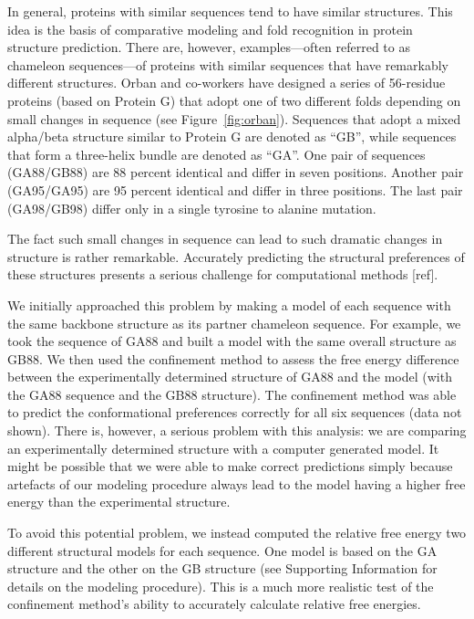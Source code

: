 \documentclass[12pt]{article}
\begin{document}
In general, proteins with similar sequences tend to have similar structures. This idea is the basis
of comparative modeling and fold recognition in protein structure prediction. There are, however,
examples---often referred to as chameleon sequences---of proteins with similar sequences that have
remarkably different structures. Orban and co-workers have designed a series of 56-residue proteins
(based on Protein G) that adopt one of two different folds depending on small changes in sequence
(see Figure~\ref{fig:orban}). Sequences that adopt a mixed alpha/beta structure similar to Protein G
are denoted as ``GB'', while sequences that form a three-helix bundle are denoted as ``GA''. One
pair of sequences (GA88/GB88) are 88 percent identical and differ in seven positions. Another pair
(GA95/GA95) are 95 percent identical and differ in three positions. The last pair (GA98/GB98) differ
only in a single tyrosine to alanine mutation.

The fact such small changes in sequence can lead to such dramatic changes in structure is rather
remarkable. Accurately predicting the structural preferences of these structures presents a serious
challenge for computational methods [ref].

We initially approached this problem by making a model of each sequence with the same backbone
structure as its partner chameleon sequence. For example, we took the sequence of GA88 and built a
model with the same overall structure as GB88. We then used the confinement method to assess the
free energy difference between the experimentally determined structure of GA88 and the model (with
the GA88 sequence and the GB88 structure). The confinement method was able to predict the
conformational preferences correctly for all six sequences (data not shown). There is, however, a
serious problem with this analysis: we are comparing an experimentally determined structure with a
computer generated model. It might be possible that we were able to make correct predictions simply
because artefacts of our modeling procedure always lead to the model having a higher free energy
than the experimental structure.

To avoid this potential problem, we instead computed the relative free energy two different
structural models for each sequence. One model is based on the GA structure and the other on the GB
structure (see Supporting Information for details on the modeling procedure). This is a much more
realistic test of the confinement method's ability to accurately calculate relative free energies.
\end{document}
